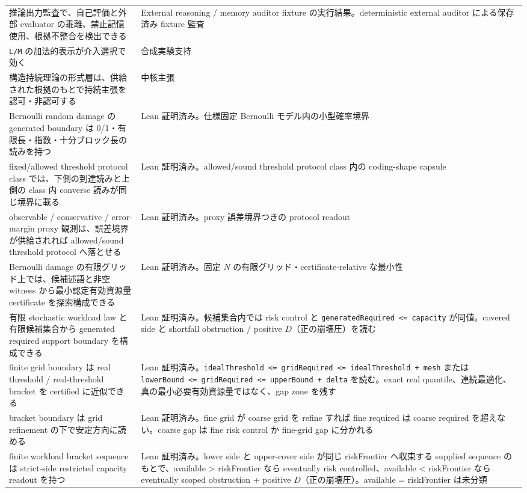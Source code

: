 \documentclass[12pt,a4paper]{article}
\begin{document}
{\begin{longtable}[]{@{}
  >{\raggedright\arraybackslash}p{}
  >{\raggedright\arraybackslash}p{}@{}}
推論出力監査で、自己評価と外部 evaluator の乖離、禁止記憶使用、根拠不整合を検出できる & External reasoning / memory auditor fixture の実行結果。deterministic external auditor による保存済み fixture 監査 \\
\texttt{L/M} の加法的表示が介入選択で効く & 合成実験支持 \\
構造持続理論の形式層は、供給された根拠のもとで持続主張を認可・非認可する & 中核主張 \\
Bernoulli random damage の generated boundary は 0/1・有限長・指数・十分ブロック長の読みを持つ & Lean 証明済み。仕様固定 Bernoulli モデル内の小型確率境界 \\
fixed/allowed threshold protocol class では、下側の到達読みと上側の class 内 converse 読みが同じ境界に載る & Lean 証明済み。allowed/sound threshold protocol class 内の coding-shape capsule \\
observable / conservative / error-margin proxy 観測は、誤差境界が供給されれば allowed/sound threshold protocol へ落とせる & Lean 証明済み。proxy 誤差境界つきの protocol readout \\
Bernoulli damage の有限グリッド上では、候補述語と非空 witness から最小認定有効資源量 certificate を探索構成できる & Lean 証明済み。固定 \(N\) の有限グリッド・certificate-relative な最小性 \\
有限 stochastic workload law と有限候補集合から generated required support boundary を構成できる & Lean 証明済み。候補集合内では risk control と \texttt{generatedRequired\ \textless{}=\ capacity} が同値。covered side と shortfall obstruction / positive \(D\)（正の崩壊圧）を読む \\
finite grid boundary は real threshold / real-threshold bracket を certified に近似できる & Lean 証明済み。\texttt{idealThreshold\ \textless{}=\ gridRequired\ \textless{}=\ idealThreshold\ +\ mesh} または \texttt{lowerBound\ \textless{}=\ gridRequired\ \textless{}=\ upperBound\ +\ delta} を読む。exact real quantile、連続最適化、真の最小必要有効資源量ではなく、gap zone を残す \\
bracket boundary は grid refinement の下で安定方向に読める & Lean 証明済み。fine grid が coarse grid を refine すれば fine required は coarse required を超えない。coarse gap は fine risk control か fine-grid gap に分かれる \\
finite workload bracket sequence は strict-side restricted capacity readout を持つ & Lean 証明済み。lower side と upper-cover side が同じ riskFrontier へ収束する supplied sequence のもとで、available \textgreater{} riskFrontier なら eventually risk controlled、available \textless{} riskFrontier なら eventually scoped obstruction + positive \(D\)（正の崩壊圧）。available = riskFrontier は未分類 \\

\end{longtable}}
\end{document}
